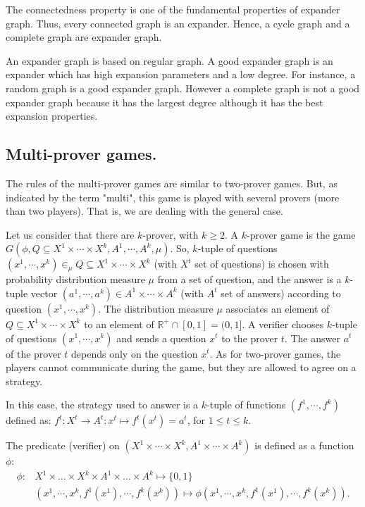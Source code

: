 The connectedness  property is one of the fundamental properties of expander graph. Thus, every connected graph is an expander. Hence, a cycle graph and a complete graph are expander graph.

An expander graph is based on regular graph. A good expander graph is an expander which has high expansion parameters and a low degree.  For instance, a random graph is a good expander graph. However a complete graph is not a good expander graph because it has the largest degree although it has the best expansion properties.


 \subsection{Multi-prover games.} The rules of the multi-prover games are similar to two-prover games. But, as indicated by the term "multi", this game is played
 with several provers (more than two players). That is, we are dealing with the general case.

Let us consider that there are $k$-prover, with $k \geq 2$. A $k$-prover  game is the game $G(\phi, Q \subseteq X^1  \times \cdots \times X^k , A^1 , \cdots,  A^k, \mu) $. So, $k$-tuple of questions $(x^1, \cdots , x^k) \in_{\mu} Q \subseteq X^1  \times \cdots \times X^k $ (with $X^t$ set of questions)
is chosen with probability distribution measure $\mu $ from a set of question,
and the answer is a $k$-tuple vector $(a^1, \cdots , a^k)  \in A^1 \times \cdots \times A^k$ (with $A^t$ set of answers) according to question $(x^1, \cdots , x^k).$ The distribution measure $\mu $ associates an element of $ Q \subseteq  X^1  \times \cdots \times X^k $ to an element of $\mathbb{R}^+ \cap [0,1]= (0, 1].$
A verifier chooses $k$-tuple of questions $(x^1, \cdots , x^k)$ and sends a question $x^t$ to the prover $t$. The answer $a^t$ of the prover $t$ depends only on the question $x^t.$ As for two-prover games, the players cannot communicate during the game, but they are allowed to agree on a strategy. 

In this case, the strategy used to answer is a $k$-tuple of functions $(f^1, \cdots , f^k)$ defined as:
$f^t: X^t \longrightarrow A^t: x^t \longmapsto f^t(x^t)=a^t$, for $1\leq t \leq k.$

The predicate (verifier) on $( X^1 \times \cdots \times X^k, A^1 \times \cdots \times A^k)$ is defined as a function $\phi$:
\begin{align*}
\phi : & X^1 \times \ldots \times X^k \times A^1 \times \ldots \times A^k \longmapsto \{0,1\} \\
& (x^1, \cdots , x^k, f^1(x^1), \cdots , f^k(x^k)) \longmapsto \phi (x^1, \cdots , x^k, f^1(x^1), \cdots , f^k(x^k)).
\end{align*}

